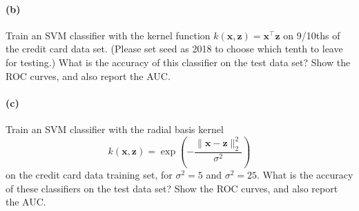 \documentclass[11pt]{article}
\begin{document}
\paragraph{(b)} Train an SVM classifier with the kernel function $k(\mathbf{x}, \mathbf{z}) = \mathbf{x}^\top \mathbf{z}$ on 9/10ths of the credit card data set. (Please set seed as 2018 to choose which tenth to leave for testing.) What is the accuracy of this classifier on the test data set? Show the ROC curves, and also report the AUC.

\paragraph{(c)} Train an SVM classifier with the radial basis kernel
\begin{equation*}
k(\mathbf{x}, \mathbf{z}) = \exp\left(-\frac{\|\mathbf{x} - \mathbf{z}\|_2^2}{\sigma^2}\right)
\end{equation*}
on the credit card data training set, for $\sigma^2=5$ and $\sigma^2=25$. What is the accuracy of these classifiers on the test data set? Show the ROC curves, and also report the AUC.


  
\end{document}
